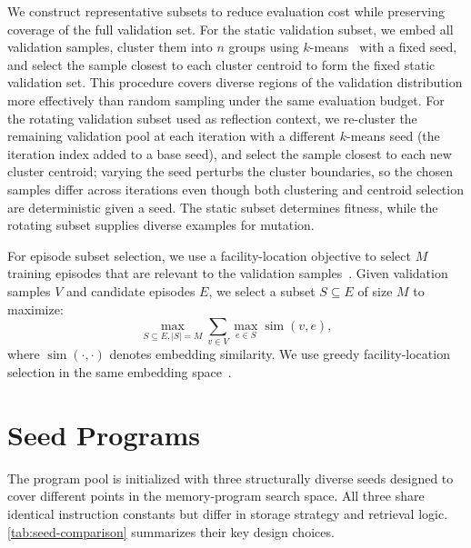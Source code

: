 We construct representative subsets to reduce evaluation cost while preserving coverage of the full validation set.
For the static validation subset, we embed all validation samples, cluster them into $n$ groups using $k$-means~\citep{macqueen1967kmeans} with a fixed seed, and select the sample closest to each cluster centroid to form the fixed static validation set.
This procedure covers diverse regions of the validation distribution more effectively than random sampling under the same evaluation budget.
For the rotating validation subset used as reflection context, we re-cluster the remaining validation pool at each iteration with a different $k$-means seed (the iteration index added to a base seed), and select the sample closest to each new cluster centroid; varying the seed perturbs the cluster boundaries, so the chosen samples differ across iterations even though both clustering and centroid selection are deterministic given a seed.
The static subset determines fitness, while the rotating subset supplies diverse examples for mutation.

For episode subset selection, we use a facility-location objective to select $M$ training episodes that are relevant to the validation samples~\citep{nemhauser1978submodular}.
Given validation samples $V$ and candidate episodes $E$, we select a subset $S \subseteq E$ of size $M$ to maximize:
\begin{equation}
    \max_{S \subseteq E, |S|=M} \sum_{v \in V} \max_{e \in S} \operatorname{sim}(v, e),
\end{equation}
where $\operatorname{sim}(\cdot, \cdot)$ denotes embedding similarity.
We use greedy facility-location selection in the same embedding space~\citep{nemhauser1978submodular}.

\FloatBarrier



\section{Seed Programs}
\label{app:seeds}

The program pool is initialized with three structurally diverse seeds designed to cover different points in the memory-program search space.
All three share identical instruction constants but differ in storage strategy and retrieval logic.
\autoref{tab:seed-comparison} summarizes their key design choices.

